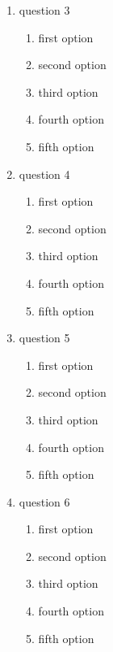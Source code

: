 \documentclass[amsfonts,bezier,leqno,fleqn,12pt,a4paper]{article}
\begin{document}
{{{\begin{large}
\begin{enumerate}
\begin{enumerate}
  \item first option
  \item second option
  \item third option
  \item fourth option
  \item fifth option
\end{enumerate}
\newpage
\item question 3
\vspace {0.3in}
\setcounter{equation}{0}

\begin{enumerate}
  \item first option
  \item second option
  \item third option
  \item fourth option
  \item fifth option
\end{enumerate}
\vspace {3.5cm}
\item question 4
\vspace {0.3in}
\setcounter{equation}{0}

\begin{enumerate}
  \item first option
  \item second option
  \item third option
  \item fourth option
  \item fifth option
\end{enumerate}
\newpage
\item question 5
\vspace {0.3in}
\setcounter{equation}{0}

\begin{enumerate}
  \item first option
  \item second option
  \item third option
  \item fourth option
  \item fifth option
\end{enumerate}
\vspace {3.5cm}
\item question 6
\vspace {0.3in}
\setcounter{equation}{0}

\begin{enumerate}
  \item first option
  \item second option
  \item third option
  \item fourth option
  \item fifth option
\end{enumerate}
\newpage
\end{enumerate}
\end{large}

}}}
\end{document}
